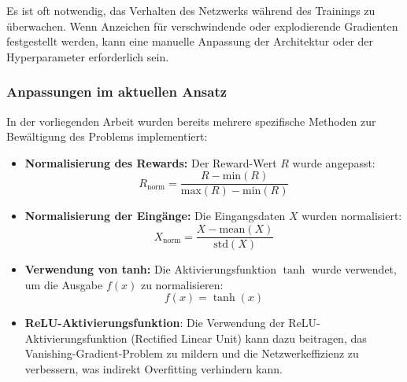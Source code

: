 Es ist oft notwendig, das Verhalten des Netzwerks während des Trainings zu überwachen. Wenn Anzeichen für verschwindende oder explodierende Gradienten festgestellt werden, kann eine manuelle Anpassung der Architektur oder der Hyperparameter erforderlich sein.

\subsubsection{Anpassungen im aktuellen Ansatz}

In der vorliegenden Arbeit wurden bereits mehrere spezifische Methoden zur Bewältigung des Problems implementiert:


\begin{itemize}
    \item \textbf{Normalisierung des Rewards:} Der Reward-Wert \( R \) wurde angepasst:
    \[
    R_{\text{norm}} = \frac{R - \text{min}(R)}{\text{max}(R) - \text{min}(R)}
    \]
    
    \item \textbf{Normalisierung der Eingänge:} Die Eingangsdaten \( X \) wurden normalisiert:
    \[
    X_{\text{norm}} = \frac{X - \text{mean}(X)}{\text{std}(X)}
    \]
    
    \item \textbf{Verwendung von tanh:} Die Aktivierungsfunktion \(\tanh\) wurde verwendet, um die Ausgabe \( f(x) \) zu normalisieren:
    \[
    f(x) = \tanh(x)
    \]

    \item \textbf{ReLU-Aktivierungsfunktion}: Die Verwendung der ReLU-Aktivierungsfunktion (Rectified Linear Unit) kann dazu beitragen, das Vanishing-Gradient-Problem zu mildern und die Netzwerkeffizienz zu verbessern, was indirekt Overfitting verhindern kann.
\end{itemize}

